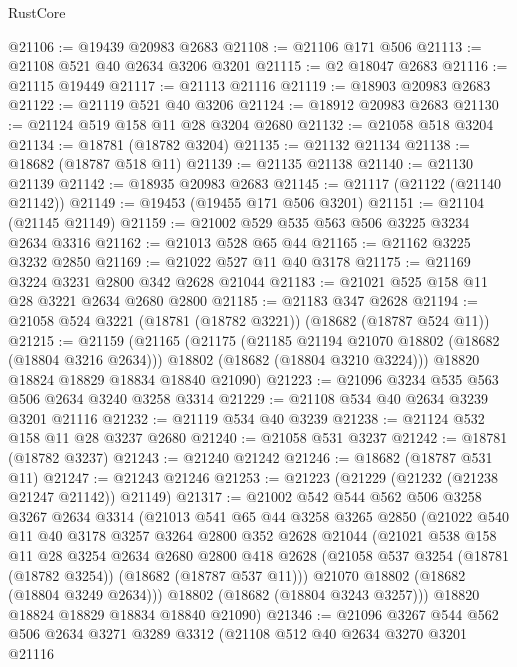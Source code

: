 \begin{lexlean}{RustCore}
\begin{coremodule}
@21106 := @19439 @20983 @2683
@21108 := @21106 @171 @506
@21113 := @21108 @521 @40 @2634 @3206 @3201
@21115 := @2 @18047 @2683
@21116 := @21115 @19449
@21117 := @21113 @21116
@21119 := @18903 @20983 @2683
@21122 := @21119 @521 @40 @3206
@21124 := @18912 @20983 @2683
@21130 := @21124 @519 @158 @11 @28 @3204 @2680
@21132 := @21058 @518 @3204
@21134 := @18781 (@18782 @3204)
@21135 := @21132 @21134
@21138 := @18682 (@18787 @518 @11)
@21139 := @21135 @21138
@21140 := @21130 @21139
@21142 := @18935 @20983 @2683
@21145 := @21117 (@21122 (@21140 @21142))
@21149 := @19453 (@19455 @171 @506 @3201)
@21151 := @21104 (@21145 @21149)
@21159 := @21002 @529 @535 @563 @506 @3225 @3234 @2634 @3316
@21162 := @21013 @528 @65 @44
@21165 := @21162 @3225 @3232 @2850
@21169 := @21022 @527 @11 @40 @3178
@21175 := @21169 @3224 @3231 @2800 @342 @2628 @21044
@21183 := @21021 @525 @158 @11 @28 @3221 @2634 @2680 @2800
@21185 := @21183 @347 @2628
@21194 := @21058 @524 @3221 (@18781 (@18782 @3221)) (@18682 (@18787 @524 @11))
@21215 := @21159
    (@21165
      (@21175
        (@21185 @21194 @21070 @18802 (@18682 (@18804 @3216 @2634)))
        @18802
        (@18682 (@18804 @3210 @3224)))
      @18820
      @18824
      @18829
      @18834
      @18840
      @21090)
@21223 := @21096 @3234 @535 @563 @506 @2634 @3240 @3258 @3314
@21229 := @21108 @534 @40 @2634 @3239 @3201 @21116
@21232 := @21119 @534 @40 @3239
@21238 := @21124 @532 @158 @11 @28 @3237 @2680
@21240 := @21058 @531 @3237
@21242 := @18781 (@18782 @3237)
@21243 := @21240 @21242
@21246 := @18682 (@18787 @531 @11)
@21247 := @21243 @21246
@21253 := @21223 (@21229 (@21232 (@21238 @21247 @21142)) @21149)
@21317 := @21002
    @542
    @544
    @562
    @506
    @3258
    @3267
    @2634
    @3314
    (@21013
      @541
      @65
      @44
      @3258
      @3265
      @2850
      (@21022
        @540
        @11
        @40
        @3178
        @3257
        @3264
        @2800
        @352
        @2628
        @21044
        (@21021
          @538
          @158
          @11
          @28
          @3254
          @2634
          @2680
          @2800
          @418
          @2628
          (@21058 @537 @3254 (@18781 (@18782 @3254)) (@18682 (@18787 @537 @11)))
          @21070
          @18802
          (@18682 (@18804 @3249 @2634)))
        @18802
        (@18682 (@18804 @3243 @3257)))
      @18820
      @18824
      @18829
      @18834
      @18840
      @21090)
@21346 := @21096
    @3267
    @544
    @562
    @506
    @2634
    @3271
    @3289
    @3312
    (@21108
      @512
      @40
      @2634
      @3270
      @3201
      @21116

\end{coremodule}
\end{lexlean}
